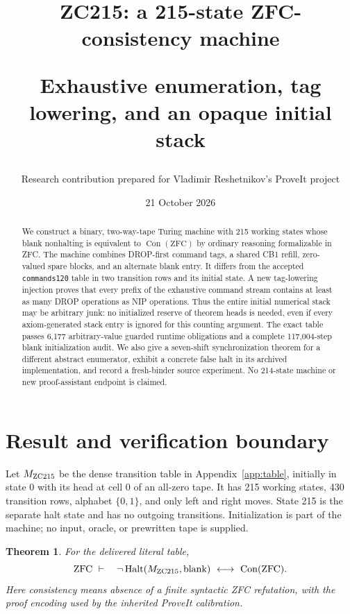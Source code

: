 \documentclass[11pt,a4paper]{article}
\title{\vspace{-12mm}\textbf{ZC215: a 215-state ZFC-consistency machine}\par\vspace{3mm}
\large Exhaustive enumeration, tag lowering, and an opaque initial stack}
\author{Research contribution prepared for Vladimir Reshetnikov's ProveIt project}
\date{21 October 2026}
\newtheorem{theorem}{Theorem}[section]
\theoremstyle{remark}\newtheorem{remark}[theorem]{Remark}
\newcommand{\Con}{\operatorname{Con}}
\newcommand{\Halt}{\operatorname{Halt}}
\begin{document}
\maketitle\thispagestyle{empty}
\begin{abstract}
We construct a binary, two-way-tape Turing machine with 215 working states whose blank nonhalting is equivalent to $\Con(\mathrm{ZFC})$ by ordinary reasoning formalizable in ZFC. The machine combines DROP-first command tags, a shared CB1 refill, zero-valued spare blocks, and an alternate blank entry. It differs from the accepted \texttt{commands120} table in two transition rows and its initial state. A new tag-lowering injection proves that every prefix of the exhaustive command stream contains at least as many DROP operations as NIP operations. Thus the entire initial numerical stack may be arbitrary junk: no initialized reserve of theorem heads is needed, even if every axiom-generated stack entry is ignored for this counting argument. The exact table passes 6,177 arbitrary-value guarded runtime obligations and a complete 117,004-step blank initialization audit. We also give a seven-shift synchronization theorem for a different abstract enumerator, exhibit a concrete false halt in its archived implementation, and record a fresh-binder source experiment. No 214-state machine or new proof-assistant endpoint is claimed.
\end{abstract}

\section{Result and verification boundary}

Let $M_{\rm ZC215}$ be the dense transition table in Appendix~\ref{app:table}, initially in state 0 with its head at cell 0 of an all-zero tape. It has 215 working states, 430 transition rows, alphabet $\{0,1\}$, and only left and right moves. State 215 is the separate halt state and has no outgoing transitions. Initialization is part of the machine; no input, oracle, or prewritten tape is supplied.

\begin{theorem}\label{thm:main}
For the delivered literal table,
\[
 \mathrm{ZFC}\ \vdash\quad
 \neg\Halt(M_{\rm ZC215},\mathrm{blank})
 \ \longleftrightarrow\ \Con(\mathrm{ZFC}).
\]
Here consistency means absence of a finite syntactic ZFC refutation, with the proof encoding used by the inherited ProveIt calibration.
\end{theorem}
\end{document}
